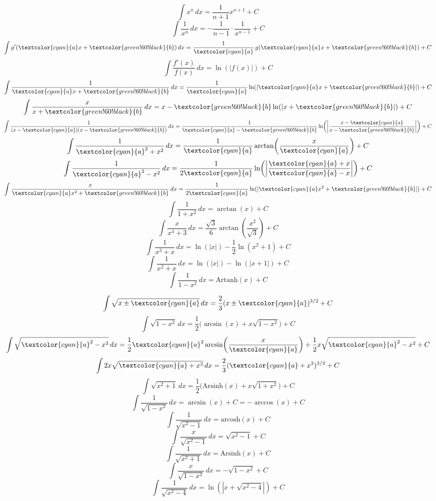 \begin{formulabox}[breakable]
    \[
    \int x^n\,dx = \frac{1}{n+1}x^{n+1}+C
    \]
    \[
    \int \frac{1}{x^n}\,dx = -\frac{1}{n-1}\cdot\frac{1}{x^{n-1}}+C
    \]
    \[
    \int g'(\textcolor{cyan}{a}x+\textcolor{green!60!black}{b})\,dx = \frac{1}{\textcolor{cyan}{a}}\,g(\textcolor{cyan}{a}x+\textcolor{green!60!black}{b})+C
    \]
    \[
    \int \frac{f'(x)}{f(x)}\,dx = \ln(|f(x)|)+C
    \]
    \[
    \int \frac{1}{\textcolor{cyan}{a}x+\textcolor{green!60!black}{b}}\,dx = \frac{1}{\textcolor{cyan}{a}}\ln(|\textcolor{cyan}{a}x+\textcolor{green!60!black}{b}|)+C
    \]
    \[
    \int \frac{x}{x+\textcolor{green!60!black}{b}}\,dx = x - \textcolor{green!60!black}{b}\ln(|x+\textcolor{green!60!black}{b}|)+C
    \]
    \[
    \int \frac{1}{(x-\textcolor{cyan}{a})(x-\textcolor{green!60!black}{b})}\,dx
    = \frac{1}{\textcolor{cyan}{a}-\textcolor{green!60!black}{b}}
    \ln\!\left(\left|\frac{x-\textcolor{cyan}{a}}{x-\textcolor{green!60!black}{b}}\right|\right)+C
    \]
    \[
    \int \frac{1}{\textcolor{cyan}{a}^2+x^2}\,dx = \frac{1}{\textcolor{cyan}{a}}\arctan\!\left(\frac{x}{\textcolor{cyan}{a}}\right)+C
    \]
    \[
    \int \frac{1}{\textcolor{cyan}{a}^2-x^2}\,dx = \frac{1}{2\textcolor{cyan}{a}}\ln\!\left(\left|\frac{\textcolor{cyan}{a}+x}{\textcolor{cyan}{a}-x}\right|\right)+C
    \]
    \[
    \int \frac{x}{\textcolor{cyan}{a}x^2+\textcolor{green!60!black}{b}}\,dx = \frac{1}{2\textcolor{cyan}{a}}\ln(|\textcolor{cyan}{a}x^2+\textcolor{green!60!black}{b}|)+C
    \]
    \[
    \int \frac{1}{1+x^2}\,dx = \arctan(x)+C
    \]
    \[
    \int \frac{x}{x^4+3}\,dx = \frac{\sqrt{3}}{6}\arctan\!\left(\frac{x^2}{\sqrt{3}}\right)+C
    \]
    \[
    \int \frac{1}{x^3+x}\,dx = \ln(|x|)-\frac{1}{2}\ln(x^2+1)+C
    \]
    \[
    \int \frac{1}{x^2+x}\,dx = \ln(|x|)-\ln(|x+1|)+C
    \]
    \[
    \int \frac{1}{1-x^2}\,dx = \mathrm{Artanh}(x)+C
    \]
\end{formulabox}

\begin{formulabox}[breakable]
    \[
    \int \sqrt{x\pm \textcolor{cyan}{a}}\,dx = \frac{2}{3}(x\pm \textcolor{cyan}{a})^{3/2}+C
    \]
    \[
    \int \sqrt{1-x^2}\,dx = \frac{1}{2}\bigl(\arcsin(x)+x\sqrt{1-x^2}\bigr)+C
    \]
    \[
    \int \sqrt{\textcolor{cyan}{a}^2-x^2}\,dx = \frac{1}{2}\textcolor{cyan}{a}^2\arcsin\!\left(\frac{x}{\textcolor{cyan}{a}}\right) + \frac{1}{2}x\sqrt{\textcolor{cyan}{a}^2-x^2}+C
    \]
    \[
    \int 2x\sqrt{\textcolor{cyan}{a}+x^2}\,dx = \frac{2}{3}(\textcolor{cyan}{a}+x^2)^{3/2}+C
    \]
    \[
    \int \sqrt{x^2+1}\,dx = \frac{1}{2}\bigl(\mathrm{Arsinh}(x)+x\sqrt{1+x^2}\bigr)+C
    \]
    \[
    \int \frac{1}{\sqrt{1-x^2}}\,dx = \arcsin(x)+C=-\arccos(x)+C
    \]
    \[
    \int \frac{1}{\sqrt{x^2-1}}\,dx = \mathrm{arcosh}(x)+C
    \]
    \[
    \int \frac{x}{\sqrt{x^2-1}}\,dx = \sqrt{x^2-1}+C
    \]
    \[
    \int \frac{1}{\sqrt{x^2+1}}\,dx = \mathrm{Arsinh}(x)+C
    \]
    \[
    \int \frac{x}{\sqrt{1-x^2}}\,dx = -\sqrt{1-x^2}+C
    \]
    \[
    \int \frac{1}{\sqrt{x^2-4}}\,dx = \ln\!\left(\left|x+\sqrt{x^2-4}\right|\right)+C
    \]
\end{formulabox}

